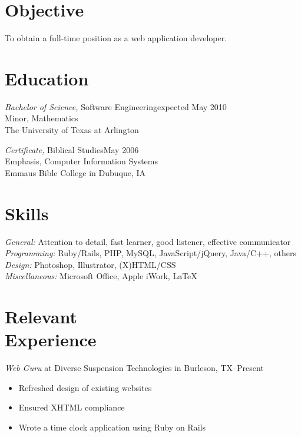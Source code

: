 \documentclass[margin]{res}
\begin{document}
\begin{resume}
 
\section{\textsf{Objective}} 

                To obtain a full-time position as a web application developer.


\section{\textsf{Education}} 

                {\sl Bachelor of Science,} Software Engineering\dotfill expected May 2010\\
                Minor, Mathematics\\
                The University of Texas at Arlington
                
                {\sl Certificate,} Biblical Studies\dotfill May 2006 \\
                Emphasis, Computer Information Systems\\
                Emmaus Bible College in Dubuque, IA
 
 
\section{\textsf{Skills}}

                {\sl General:} Attention to detail, fast learner, good listener, effective communicator  \\
                {\sl Programming:} Ruby/Rails, PHP, MySQL, JavaScript/jQuery, Java/C++, others \\
                {\sl Design:} Photoshop, Illustrator, (X)HTML/CSS \\
                {\sl Miscellaneous:} Microsoft Office, Apple iWork, \LaTeX


\section{\textsf{Relevant \\ Experience}} 
                
                {\sl Web Guru}
                 at Diverse Suspension Technologies in Burleson, TX--Present
                 \begin{itemize} \itemsep -2pt %
                   \item Refreshed design of existing websites
                   \item Ensured XHTML compliance
                   \item Wrote a time clock application using Ruby on Rails
                \end{itemize}
                

\end{resume}
\end{document}
